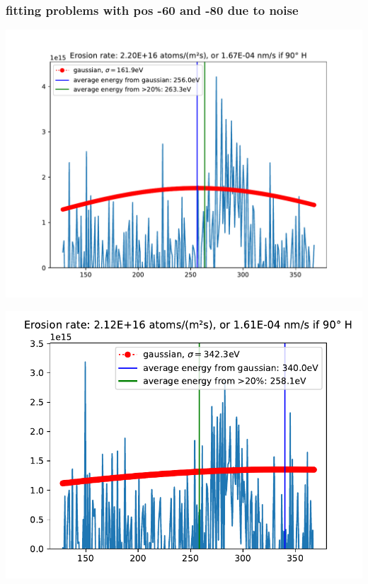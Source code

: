 \documentclass{beamer} %
\begin{document}
\begin{frame}
    \frametitle{fitting problems with pos -60 and -80 due to noise}
    \begin{minipage}{0.49\textwidth}
        \includegraphics[width=1.1\textwidth]{figures/-60fitproblem.pdf}
    \end{minipage}
    \begin{minipage}{0.49\textwidth}
        \includegraphics[width=1.1\textwidth]{figures/-80fitproblem.pdf}
    \end{minipage}
\end{frame}
\end{document}
